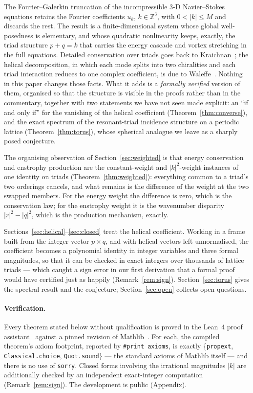 \documentclass[11pt]{amsart}
\newcommand{\Z}{\mathbb{Z}}
\theoremstyle{plain}
\theoremstyle{definition}
\theoremstyle{remark}
\begin{document}
The Fourier--Galerkin truncation of the incompressible 3-D Navier--Stokes equations retains the
Fourier coefficients $u_k$, $k \in \Z^3$, with $0 < |k| \le M$ and discards the rest. The result
is a finite-dimensional system whose global well-posedness is elementary, and whose quadratic
nonlinearity keeps, exactly, the triad structure $p + q = k$ that carries the energy cascade and
vortex stretching in the full equations. Detailed conservation over triads goes back to
Kraichnan~\cite{kraichnan1959}; the helical decomposition, in which each mode splits into two
chiralities and each triad interaction reduces to one complex coefficient, is due to
Waleffe~\cite{waleffe1992}. Nothing in this paper changes those facts. What it adds is a
\emph{formally verified} version of them, organised so that the structure is visible in the
proofs rather than in the commentary, together with two statements we have not seen made
explicit: an ``if and only if'' for the vanishing of the helical coefficient
(Theorem~\ref{thm:converse}), and the exact spectrum of the resonant-triad incidence structure on
a periodic lattice (Theorem~\ref{thm:torus}), whose spherical analogue we leave as a sharply
posed conjecture.

The organising observation of Section~\ref{sec:weighted} is that energy conservation and enstrophy
production are the constant-weight and $|k|^2$-weight instances of one identity on triads
(Theorem~\ref{thm:weighted}): everything common to a triad's two orderings cancels, and what
remains is the difference of the weight at the two swapped members. For the energy weight the
difference is zero, which is the conservation law; for the enstrophy weight it is the wavenumber
disparity $|r|^2 - |q|^2$, which is the production mechanism, exactly.

Sections~\ref{sec:helical}--\ref{sec:closed} treat the helical coefficient. Working in a frame
built from the integer vector $p \times q$, and with helical vectors left unnormalised, the
coefficient becomes a polynomial identity in integer variables and three formal magnitudes, so
that it can be checked in exact integers over thousands of lattice triads --- which caught a sign
error in our first derivation that a formal proof would have certified just as happily
(Remark~\ref{rem:sign}). Section~\ref{sec:torus} gives the spectral result and the conjecture;
Section~\ref{sec:open} collects open questions.

\paragraph{Verification.} Every theorem stated below without qualification is proved in the
Lean~4 proof assistant~\cite{lean4} against a pinned revision of Mathlib~\cite{mathlib}. For each,
the compiled theorem's axiom footprint, reported by \texttt{\#print axioms}, is exactly
\{\texttt{propext}, \texttt{Classical.choice}, \texttt{Quot.sound}\} --- the standard axioms of
Mathlib itself --- and there is no use of \texttt{sorry}. Closed forms involving the irrational
magnitudes $|k|$ are additionally checked by an independent exact-integer computation
(Remark~\ref{rem:sign}). The development is public (Appendix).
\end{document}
